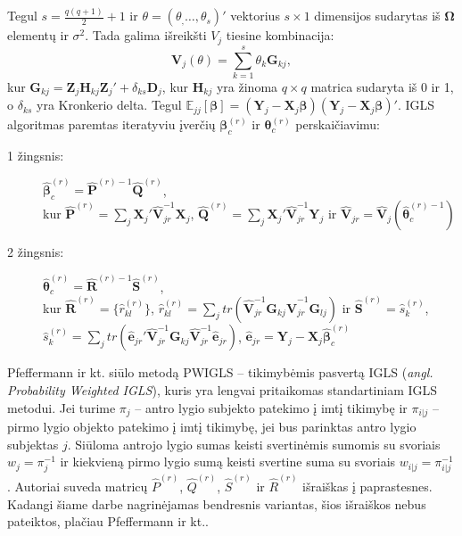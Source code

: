 \documentclass[11pt,a4paper]{article}
\begin{document}
\indent Tegul $s=\frac{q(q+1)}{2}+1$ ir $\theta=(\theta_,\dots,\theta_s)'$ vektorius $s\times 1$ dimensijos sudarytas iš $\boldsymbol{\Omega}$ elementų ir $\sigma^2$. Tada galima išreikšti $V_j$ tiesine kombinacija:
\begin{equation*}
\mathbf{V}_j(\theta)=\sum_{k=1}^s \theta_k \mathbf{G}_{kj},
\end{equation*}
kur $\mathbf{G}_{kj}=\mathbf{Z}_j\mathbf{H}_{kj}\mathbf{Z}_j'+\delta_{ks}\mathbf{D}_j$, kur $\mathbf{H}_{kj}$ yra žinoma $q\times q$ matrica sudaryta iš 0 ir 1, o $\delta_{ks}$ yra Kronkerio delta. Tegul $\mathbb{E}_{jj}[\boldsymbol{\beta}]=(\mathbf{Y}_j-\mathbf{X}_j\boldsymbol{\beta})(\mathbf{Y}_j-\mathbf{X}_j\boldsymbol{\beta})'$. IGLS algoritmas paremtas iteratyviu įverčių $\boldsymbol{\beta}_c^{(r)}$ ir $\boldsymbol{\theta}_c^{(r)}$ perskaičiavimu:
\begin{description}
\item[1 žingsnis:] $\hat{\boldsymbol{\beta}}_c^{(r)}=\hat{\mathbf{P}}^{(r)-1}\hat{\mathbf{Q}}^{(r)}$,\\
kur $\hat{\mathbf{P}}^{(r)}=\sum_j\mathbf{X}_j'\hat{\mathbf{V}}_{jr}^{-1}\mathbf{X}_j$, $\hat{\mathbf{Q}}^{(r)}=\sum_j\mathbf{X}_j'\hat{\mathbf{V}}_{jr}^{-1}\mathbf{Y}_j$ ir $\hat{\mathbf{V}}_{jr}=\hat{\mathbf{V}}_j\left(\hat{\boldsymbol{\theta}}_c^{(r)-1}\right)$
\item[2 žingsnis:] $\hat{\boldsymbol{\theta}}_c^{(r)}=\hat{\mathbf{R}}^{(r)-1}\hat{\mathbf{S}}^{(r)}$,\\
kur $\hat{\mathbf{R}}^{(r)}=\{\hat{r}_{kl}^{(r)}\}$, $\hat{r}_{kl}^{(r)}=\sum_jtr\left(\hat{\mathbf{V}}_{jr}^{-1}\mathbf{G}_{kj}\hat{\mathbf{V}}_{jr}^{-1}\mathbf{G}_{lj}\right)$ ir $\hat{\mathbf{S}}^{(r)}=\hat{s}_k^{(r)}$, $\hat{s}_k^{(r)}=\sum_jtr\left(\hat{\mathbf{e}}_{jr}'\hat{\mathbf{V}}_{jr}^{-1}\mathbf{G}_{kj}\hat{\mathbf{V}}_{jr}^{-1}\hat{\mathbf{e}}_{jr}\right)$, $\hat{\mathbf{e}}_{jr}=\mathbf{Y}_j - \mathbf{X}_j\hat{\boldsymbol{\beta}}_c^{(r)}$
\end{description}

\indent Pfeffermann ir kt. siūlo metodą PWIGLS -- tikimybėmis pasvertą IGLS (\textit{angl. Probability Weighted IGLS}), kuris yra lengvai pritaikomas standartiniam IGLS metodui. Jei turime $\pi_j$ -- antro lygio subjekto patekimo į imtį tikimybę ir $\pi_{i|j}$ -- pirmo lygio objekto patekimo į imtį tikimybę, jei bus parinktas antro lygio subjektas $j$. Siūloma antrojo lygio sumas keisti svertinėmis sumomis su svoriais $w_j=\pi_j^{-1}$ ir kiekvieną pirmo lygio sumą keisti svertine suma su svoriais $w_{i|j}=\pi_{i|j}^{-1}$. Autoriai suveda matricų $\hat{P}^{(r)}$, $\hat{Q}^{(r)}$, $\hat{S}^{(r)}$ ir $\hat{R}^{(r)}$ išraiškas į paprastesnes. Kadangi šiame darbe nagrinėjamas bendresnis variantas, šios išraiškos nebus pateiktos, plačiau  Pfeffermann ir kt.\cite{pfeff}.
\end{document}
